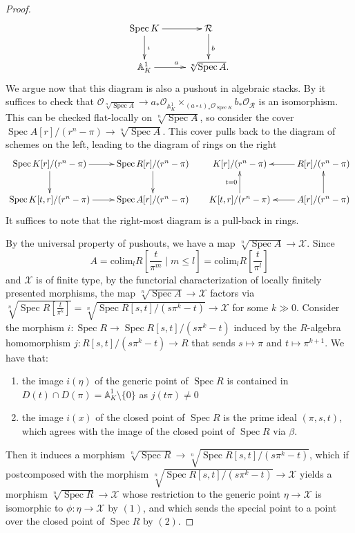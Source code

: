 \documentclass{amsart}
\theoremstyle{definition}
\newcommand{\bA}{\mathbb{A}}
\newcommand{\cX}{\mathcal{X}}
\newcommand{\cO}{\mathcal{O}}
\newcommand{\cR}{\mathcal{R}}
\newcommand{\spec}{\operatorname{Spec}}
\begin{document}
\begin{proof}
\[
\xymatrix{\spec K\ar[r] \ar[d]^\iota & \cR\ar[d]^b \\ \bA^1_{K}\ar[r]^a & \sqrt[n]{\spec A}.}
\]
We argue now that this diagram is also a pushout in algebraic stacks. By \cite[Theorem 4.2]{alper2024artin} it suffices to check that $\cO_{\sqrt[n]{\spec A}}\to a_*\cO_{\bA^1_{K}}\times_{(a\circ\iota)_*\cO_{\spec K}} b_*\cO_\cR$ is an isomorphism. This can be checked flat-locally on $\sqrt[n]{\spec A}$, so consider the cover $\spec A[r]/(r^n-\pi)\to \sqrt[n]{\spec A}$. This cover pulls back to the diagram of schemes on the left, leading to the diagram of rings on the right
\[
\xymatrix{\spec K[r]/(r^n-\pi) \ar[r] \ar[d] & \spec R[r]/(r^n-\pi) \ar[d] \\ \spec K[t,r]/(r^n-\pi)\ar[r] & \spec A[r]/(r^n-\pi)}\text{ } \text{ }\text{ }\text{ } \text{ }\xymatrix{K[r]/(r^n-\pi) & R[r]/(r^n-\pi)\ar[l] \\ K[t,r]/(r^n-\pi)\ar[u]^-{t=0} & A[r]/(r^n-\pi)\ar[u]\ar[l].}
\]
It suffices to note that the right-most diagram is a pull-back in rings. 

By the universal property of pushouts, we have a map $\sqrt[n]{\spec A} \to \cX$. Since 
\[
A=\textrm{colim}_l R\left[\frac{t}{\pi^m}\mid m\leq l\right]=\textrm{colim}_l R\left[\frac{t}{\pi^l}\right]
\]
and $\cX$ is of finite type, by the functorial characterization of locally finitely presented morphisms, the map $\sqrt[n]{\spec A}\to \cX$ factors via $\sqrt[n]{\spec R[\frac{t}{\pi^k}]} = \sqrt[n]{\spec R[s,t]/(s\pi^k-t)}\to \cX$ for some $k\gg 0$. Consider the morphism $i:\spec R\to \spec R[s,t]/(s\pi^k-t)$ induced by the $R$-algebra homomorphism $j:R[s,t]/(s\pi^k-t)\to R$ that sends $s\mapsto \pi$ and $t\mapsto \pi^{k+1}$. We have that:
\begin{enumerate}
    \item the image $i(\eta)$ of the generic point of $\spec R$ is contained in $D(t)\cap D(\pi) = \mathbb{A}^1_K\setminus \{0\}$ as $j(t\pi)\neq 0$
    \item the image $i(x)$ of the closed point of $\spec R$ is the prime ideal $(\pi, s, t)$, which agrees with the image of the closed point of $\spec R$ via $\beta$.
\end{enumerate}
Then it induces a morphism $\sqrt[n]{\spec R}\to \sqrt[n]{\spec R[s,t]/(s\pi^k-t)}$, which if postcomposed with the morphism $\sqrt[n]{\spec R[s,t]/(s\pi^k-t)}\to \cX$ yields a morphism $\sqrt[n]{\spec R} \to \cX$ whose restriction to the generic point $\eta \to \cX$ is isomorphic to $\phi : \eta \to \cX$ by $(1)$, and which sends the special point to a point over the closed point of $\spec R$ by $(2)$.
\end{proof}
\end{document}
